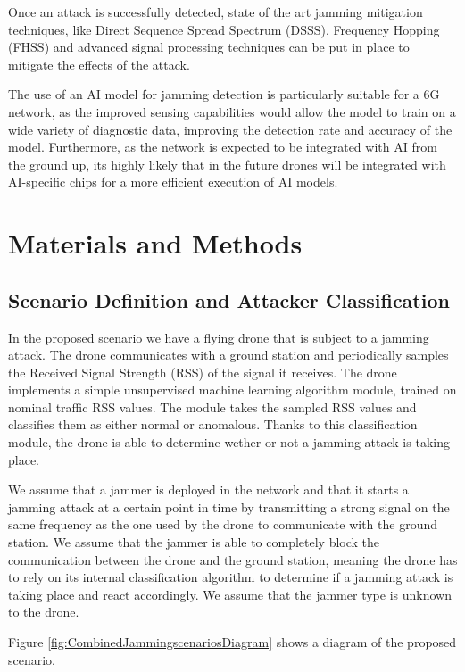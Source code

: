 \documentclass[futureinternet,article,submit,pdftex,moreauthors]{Definitions/mdpi}
\begin{document}
Once an attack is successfully detected, state of the art jamming mitigation techniques, like Direct Sequence Spread Spectrum (DSSS), Frequency Hopping (FHSS) and advanced signal processing techniques can be put in place to mitigate the 
effects of the attack. 

The use of an AI model for jamming detection is particularly suitable for a 6G network, as the improved sensing capabilities would allow the model to train on a wide variety of diagnostic data, improving the detection rate and accuracy of the model. 
Furthermore, as the network is expected to be integrated with AI from the ground up, its highly likely that in the future drones will be integrated with AI-specific chips for a more efficient execution of AI models.

\section{Materials and Methods}

\subsection{Scenario Definition and Attacker Classification}

In the proposed scenario we have a flying drone that is subject to a jamming attack. The drone communicates with a ground station and periodically samples the Received Signal Strength (RSS) of the signal it receives. 
The drone implements a simple unsupervised machine learning algorithm module, trained on nominal traffic RSS values. The module takes the sampled RSS values and classifies them as either normal or anomalous. Thanks to this classification module, the drone is able to determine wether or not a jamming attack is taking place. 

We assume that a jammer is deployed in the network and that it starts a jamming attack at a certain point in time by transmitting a strong signal on the same frequency as the one used by the drone to communicate with the ground station.
We assume that the jammer is able to completely block the communication between the drone and the ground station, meaning the drone has to rely on its internal classification algorithm to determine if a jamming attack is taking place and react accordingly.
We assume that the jammer type is unknown to the drone. 

Figure \ref{fig:CombinedJammingscenariosDiagram} shows a diagram of the proposed scenario. 
\end{document}
